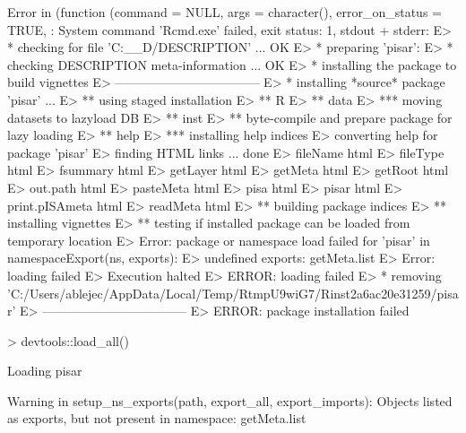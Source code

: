 \documentclass[a4paper,12pt]{article}\usepackage[]{graphicx}\usepackage[]{color}
\begin{document}
\begin{Schunk}
\begin{Soutput}
\end{Soutput}
\begin{Soutput}
Error in (function (command = NULL, args = character(), error_on_status = TRUE, : System command 'Rcmd.exe' failed, exit status: 1, stdout + stderr:
E> * checking for file 'C:\__D\OMIKE\pisar/DESCRIPTION' ... OK
E> * preparing 'pisar':
E> * checking DESCRIPTION meta-information ... OK
E> * installing the package to build vignettes
E>       -----------------------------------
E> * installing *source* package 'pisar' ...
E> ** using staged installation
E> ** R
E> ** data
E> *** moving datasets to lazyload DB
E> ** inst
E> ** byte-compile and prepare package for lazy loading
E> ** help
E> *** installing help indices
E>   converting help for package 'pisar'
E>     finding HTML links ... done
E>     fileName                                html  
E>     fileType                                html  
E>     fsummary                                html  
E>     getLayer                                html  
E>     getMeta                                 html  
E>     getRoot                                 html  
E>     out.path                                html  
E>     pasteMeta                               html  
E>     pisa                                    html  
E>     pisar                                   html  
E>     print.pISAmeta                          html  
E>     readMeta                                html  
E> ** building package indices
E> ** installing vignettes
E> ** testing if installed package can be loaded from temporary location
E> Error: package or namespace load failed for 'pisar' in namespaceExport(ns, exports):
E>  undefined exports: getMeta.list
E> Error: loading failed
E> Execution halted
E> ERROR: loading failed
E> * removing 'C:/Users/ablejec/AppData/Local/Temp/RtmpU9wiG7/Rinst2a6ac20e31259/pisar'
E>       -----------------------------------
E> ERROR: package installation failed
\end{Soutput}
\begin{Sinput}
> devtools::load_all()
\end{Sinput}
\begin{Soutput}
Loading pisar
\end{Soutput}
\begin{Soutput}
Warning in setup_ns_exports(path, export_all, export_imports): Objects listed as exports, but not present in namespace: getMeta.list
\end{Soutput}
\end{Schunk}
\end{document}
